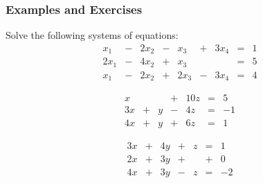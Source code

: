 \documentclass[12pt,t]{beamer}
\begin{document}
\begin{frame}\frametitle{Examples and Exercises}

Solve the following systems of equations:
\begin{equation}
\begin{array}{rrrrrrrrr}
 x_1 &-& 2x_2 &-& x_3 &+& 3x_4 &=& 1\\
 2x_1&-& 4x_2 &+& x_3 & & &=& 5\\
 x_1 &-& 2x_2 &+& 2x_3 &-& 3x_4 &=& 4
\end{array}
\end{equation}

\bigskip

\begin{equation}
 \begin{array}{rrrrrrr}
  x & & &+& 10z &=& 5\\
  3x &+& y &-& 4z &=& -1\\
  4x &+& y &+& 6z &=& 1
 \end{array}
\end{equation}

\bigskip

\begin{equation}
 \begin{array}{rrrrrrr}
  3x &+& 4y &+& z &=& 1\\
2x &+& 3y &+& &+& 0\\
4x &+& 3y &-& z &=& -2
 \end{array}
\end{equation}
\end{frame}
\end{document}
